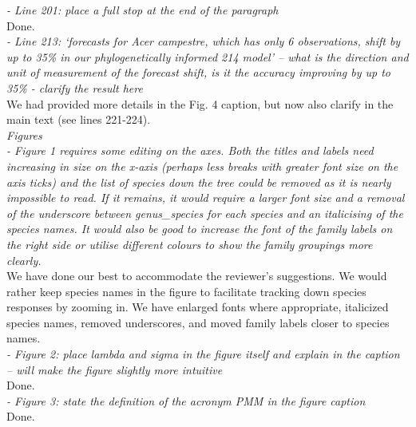 \documentclass[11pt]{article}
\begin{document}

\emph{- Line 201: place a full stop at the end of the paragraph}\\
Done.\\

\emph{- Line 213: ‘forecasts for \emph{Acer campestre}, which has only 6 observations, shift by up to 35\% in our phylogenetically informed 214 model’ – what is the direction and unit of measurement of the forecast shift, is it the accuracy improving by up to 35\% - clarify the result here}\\
We had provided more details in the Fig. 4 caption, but now also clarify in the main text (see lines 221-224).\\ %


\emph{Figures}\\
\emph{- Figure 1 requires some editing on the axes. Both the titles and labels need increasing in size on the x-axis (perhaps less breaks with greater font size on the axis ticks) and the list of species down the tree could be removed as it is nearly impossible to read. If it remains, it would require a larger font size and a removal of the underscore between genus\_species for each species and an italicising of the species names. It would also be good to increase the font of the family labels on the right side or utilise different colours to show the family groupings more clearly.}\\
We have done our best to accommodate the reviewer's suggestions. We would rather keep species names in the figure to facilitate tracking down species responses by zooming in. We have enlarged fonts where appropriate, italicized species names, removed underscores, and moved family labels closer to species names.\\

\emph{- Figure 2: place lambda and sigma in the figure itself and explain in the caption – will make the figure slightly more intuitive}\\
Done.\\

\emph{- Figure 3: state the definition of the acronym PMM in the figure caption}\\
Done.\\
\end{document}
